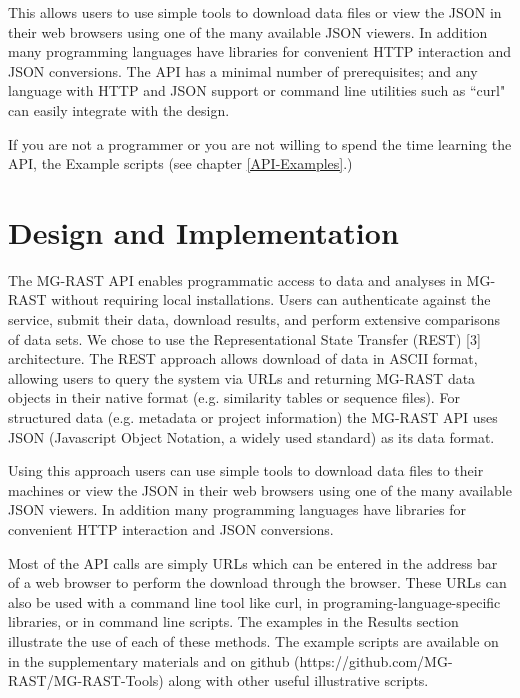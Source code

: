 This allows users to use simple tools to download data files or view the JSON in their web browsers using one of the many available JSON viewers. In addition many programming languages have libraries for convenient HTTP interaction and JSON conversions. The API has a minimal number of prerequisites; and any language with HTTP and JSON support or command line utilities such as ``curl" can easily integrate with the design.

If you are not a programmer or you are not willing to spend the time learning the API, the Example scripts (see chapter \ref{API-Examples}.)
\section{Design and Implementation}
The MG-RAST API enables programmatic access to data and analyses in MG-RAST without requiring local installations. Users can authenticate against the service, submit their data, download results, and perform extensive comparisons of data sets. We chose to use the Representational State Transfer (REST) [3] architecture. The REST approach allows download of data in ASCII format, allowing users to query the system via URLs and returning  MG-RAST data objects in their native format (e.g. similarity tables or sequence files). For structured data (e.g. metadata or project information) the MG-RAST API uses JSON (Javascript Object Notation, a widely used standard) as its data format.

Using this approach users can use simple tools to download data files to their machines or view the JSON in their web browsers using one of the many available JSON viewers. In addition many programming languages have libraries for convenient HTTP interaction and JSON conversions.

Most of the API calls are simply URLs which can be entered in the address bar of a web browser to perform the download through the browser. These URLs can also be used with a command line tool like curl, in programing-language-specific libraries, or in command line scripts. The examples in the Results section illustrate the use of each of these methods. The example scripts are available on in the supplementary materials and on github (https://github.com/MG-RAST/MG-RAST-Tools) along with other useful illustrative scripts.

